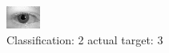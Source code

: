 \begin{figure}[h!]
\begin{center}
\includegraphics[width=0.60\columnwidth]{figures/ID604_class_2_target_3.png}
\end{center}
\caption{ Classification: 2 actual target: 3}
\label{fig:ID604_class_2_target_3}
\end{figure}
